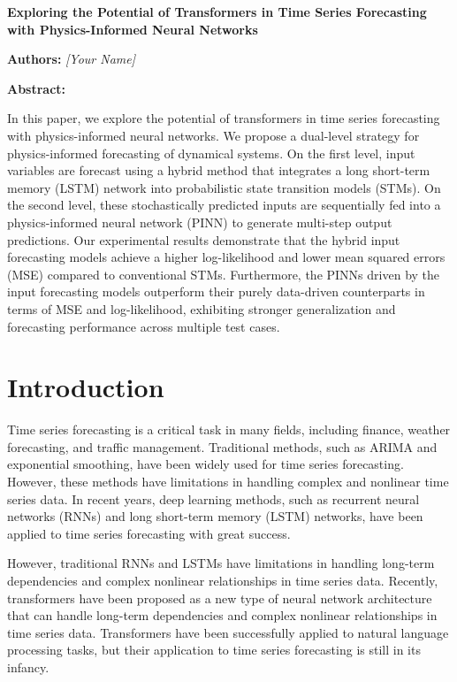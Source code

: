 \documentclass[12pt]{article}
\begin{document}
\begin{titlepage}

\begin{center}

\large{\textbf{Exploring the Potential of Transformers in Time Series Forecasting with Physics-Informed Neural Networks}}


\large{\textbf{Authors:} \textit{[Your Name]}}


\large{\textbf{Abstract:}}


In this paper, we explore the potential of transformers in time series forecasting with physics-informed neural networks. We propose a dual-level strategy for physics-informed forecasting of dynamical systems. On the first level, input variables are forecast using a hybrid method that integrates a long short-term memory (LSTM) network into probabilistic state transition models (STMs). On the second level, these stochastically predicted inputs are sequentially fed into a physics-informed neural network (PINN) to generate multi-step output predictions. Our experimental results demonstrate that the hybrid input forecasting models achieve a higher log-likelihood and lower mean squared errors (MSE) compared to conventional STMs. Furthermore, the PINNs driven by the input forecasting models outperform their purely data-driven counterparts in terms of MSE and log-likelihood, exhibiting stronger generalization and forecasting performance across multiple test cases.


\end{center}

\end{titlepage}

\section{Introduction}

Time series forecasting is a critical task in many fields, including finance, weather forecasting, and traffic management. Traditional methods, such as ARIMA and exponential smoothing, have been widely used for time series forecasting. However, these methods have limitations in handling complex and nonlinear time series data. In recent years, deep learning methods, such as recurrent neural networks (RNNs) and long short-term memory (LSTM) networks, have been applied to time series forecasting with great success.

However, traditional RNNs and LSTMs have limitations in handling long-term dependencies and complex nonlinear relationships in time series data. Recently, transformers have been proposed as a new type of neural network architecture that can handle long-term dependencies and complex nonlinear relationships in time series data. Transformers have been successfully applied to natural language processing tasks, but their application to time series forecasting is still in its infancy.
\end{document}

